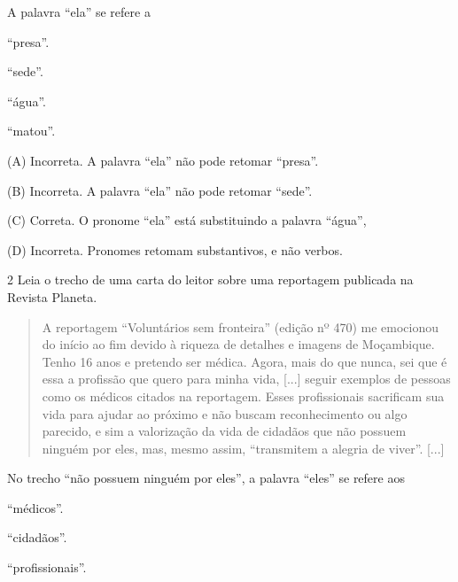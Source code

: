 \begin{escolha}
A palavra ``ela'' se refere a

\begin{escolha}
\item ``presa''.

\item ``sede''.

\item ``água''.

\item ``matou''.
\end{escolha}


(A) Incorreta. A palavra ``ela'' não pode retomar ``presa''.

(B) Incorreta. A palavra ``ela'' não pode retomar ``sede''.

(C) Correta. O pronome ``ela'' está substituindo a palavra ``água'',

(D) Incorreta. Pronomes retomam substantivos, e não verbos.

\num{2} Leia o trecho de uma carta do leitor sobre uma reportagem
publicada na Revista Planeta.

\begin{quote}
A reportagem ``Voluntários sem fronteira'' (edição nº 470) me emocionou
do início ao fim devido à riqueza de detalhes e imagens de Moçambique.
Tenho 16 anos e pretendo ser médica. Agora, mais do que nunca, sei que é
essa a profissão que quero para minha vida, {[}...{]} seguir exemplos de
pessoas como os médicos citados na reportagem. Esses profissionais
sacrificam sua vida para ajudar ao próximo e não buscam reconhecimento
ou algo parecido, e sim a valorização da vida de cidadãos que não
possuem ninguém por eles, mas, mesmo assim, ``transmitem a alegria de
viver''. {[}...{]}

\end{quote}

No trecho ``não possuem ninguém por eles'', a palavra ``eles'' se refere aos

\begin{escolha}
\item ``médicos''.

\item ``cidadãos''.

\item ``profissionais''.


\end{escolha}
\end{escolha}
